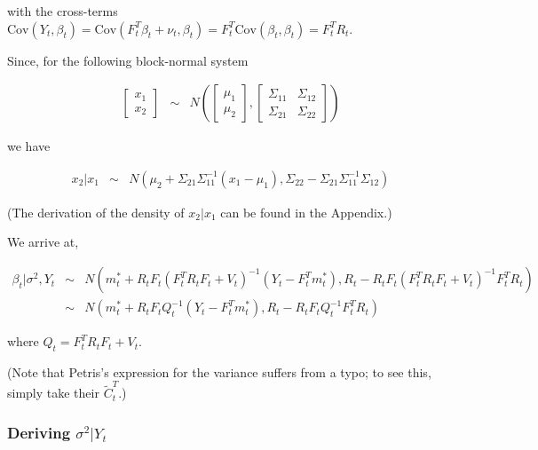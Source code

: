 \documentclass[
]{book}
\theoremstyle{definition}
\theoremstyle{definition}
\theoremstyle{definition}
\theoremstyle{definition}
\theoremstyle{remark}
\begin{document}
with the cross-terms \(\mathrm{Cov}(Y_{t},\beta_{t}) = \mathrm{Cov}(F_{t}^{T}\beta_{t} + \nu_{t},\beta_{t}) = F_{t}^{T}\mathrm{Cov}(\beta_{t}, \beta_{t}) = F_{t}^{T}R_{t}\).

Since, for the following block-normal system

\begin{eqnarray*}
\begin{bmatrix}x_{1}\\ x_{2}\end{bmatrix} &\sim& N\left(\begin{bmatrix}\mu_{1}\\ \mu_{2}\end{bmatrix}, \begin{bmatrix}\Sigma_{11} & \Sigma_{12}\\
\Sigma_{21} & \Sigma_{22}\end{bmatrix}\right)
\end{eqnarray*}

we have

\begin{eqnarray*}
x_{2}\vert x_{1} &\sim& N(\mu_{2} + \Sigma_{21}\Sigma_{11}^{-1}(x_{1} - \mu_{1}), \Sigma_{22} - \Sigma_{21}\Sigma_{11}^{-1}\Sigma_{12})
\end{eqnarray*}

(The derivation of the density of \(x_{2}\vert x_{1}\) can be found in the Appendix.)

We arrive at,

\begin{eqnarray*}
\beta_{t}\vert \sigma^{2},Y_{t} &\sim& N(m_{t}^{*} + R_{t}F_{t}(F_{t}^{T}R_{t}F_{t} + V_{t})^{-1}(Y_{t} - F_{t}^{T}m_{t}^{*}), R_{t} - R_{t}F_{t}(F_{t}^{T}R_{t}F_{t} + V_{t})^{-1}F_{t}^{T}R_{t})\\
 &\sim& N(m_{t}^{*} + R_{t}F_{t}Q_{t}^{-1}(Y_{t} - F_{t}^{T}m_{t}^{*}), R_{t} - R_{t}F_{t}Q_{t}^{-1}F_{t}^{T}R_{t})
\end{eqnarray*}

where \(Q_{t} = F_{t}^{T}R_{t}F_{t} + V_{t}\).

(Note that Petris's expression for the variance suffers from a typo; to see this, simply take their \(\widetilde{C}_{t}^{T}\).)

\hypertarget{deriving-sigma2vert-y_t}{%
\subsubsection{\texorpdfstring{Deriving \(\sigma^{2}\vert Y_{t}\)}{Deriving \textbackslash sigma\^{}\{2\}\textbackslash vert Y\_\{t\}}}\label{deriving-sigma2vert-y_t}}
\end{document}
